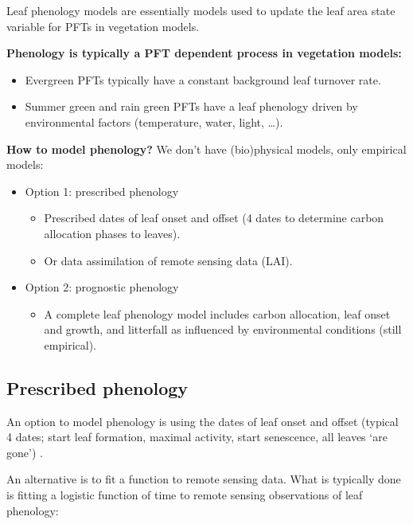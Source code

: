 \documentclass[
  12pt,
  oneside]{book}
\providecommand{\tightlist}{%
  \setlength{\itemsep}{0pt}\setlength{\parskip}{0pt}}
\begin{document}
Leaf phenology models are essentially models used to update the leaf area state variable for PFTs in vegetation models.

\textbf{Phenology is typically a PFT dependent process in vegetation models:}

\begin{itemize}
\tightlist
\item
  Evergreen PFTs typically have a constant background leaf turnover rate.
\item
  Summer green and rain green PFTs have a leaf phenology driven by environmental factors (temperature, water, light, \ldots).
\end{itemize}

\textbf{How to model phenology?} We don't have (bio)physical models, only empirical models:

\begin{itemize}
\item
  Option 1: prescribed phenology

  \begin{itemize}
  \item
    Prescribed dates of leaf onset and offset (4 dates to determine carbon allocation phases to leaves).
  \item
    Or data assimilation of remote sensing data (LAI).
  \end{itemize}
\item
  Option 2: prognostic phenology

  \begin{itemize}
  \tightlist
  \item
    A complete leaf phenology model includes carbon allocation, leaf onset and growth, and litterfall as influenced by environmental conditions (still empirical).
  \end{itemize}
\end{itemize}

\hypertarget{prescribed-phenology}{%
\subsection{Prescribed phenology}\label{prescribed-phenology}}

An option to model phenology is using the dates of leaf onset and offset (typical 4 dates; start leaf formation, maximal activity, start senescence, all leaves `are gone') .

An alternative is to fit a function to remote sensing data. What is typically done is fitting a logistic function of time to remote sensing observations of leaf phenology:
\end{document}

